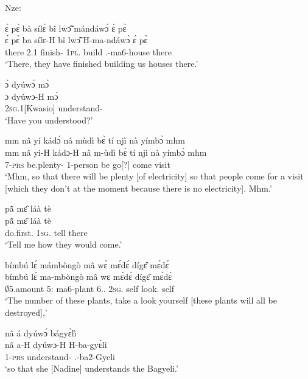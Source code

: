 \noindent Nze:

\begin{exe}[(C234)] 
\exC\label{205} 
  \glll ɛ́ pɛ̀ bà sílɛ́ bî lwɔ̃̂ mándáwɔ̀ ɛ́ pɛ̀ \\
        ɛ́ pɛ̀ ba sílɛ-H bî lwɔ̃̂ H-ma-ndáwɔ̀ ɛ́ pɛ̀  \\
        {\LOC} there 2.{\PST}1 finish-{\R} 1\textsc{pl}.{\OBJ} build {\OBJ}.{\LINK}-ma6-house {\LOC} there  \\
    \trans `There, they have finished building us houses there.'
 
\exC\label{206}
  \glll ɔ̀ dyúwɔ́ mɔ̀ \\
        ɔ dyúwɔ-H mɔ̀ \\
        2\textsc{sg}.{\PST}1[Kwasio] understand-{\R} {\COMPL}  \\
    \trans `Have you understood?'
 
\exC\label{207}
  \glll mm nâ yí kádɔ́ nâ mùdì bɛ̀ tí njì nà yímbɔ̀ mhm \\
        mm nâ yi-H kádɔ-H nâ m-ùdì bɛ̀ tí njì nà yímbɔ̀ mhm \\
        {\EXCL} {\COMP} 7-\textsc{prs} be.plenty-{\R} {\COMP} {\N}1-person be go[?] come {\CONJ} visit {\EXCL} \\
    \trans `Mhm, so that there will be plenty [of electricity] so that people come for a visit [which they don't at the moment because there is no electricity]. Mhm.'
 
\exC\label{208}
  \glll pã̂ mɛ̂ láà tè  \\
      pã̂ mɛ̂ láà tè \\
        do.first.{\IMP}  1\textsc{sg}.{\OBJ} tell there  \\
    \trans `Tell me how they would come.'
 
\exC\label{209}
  \glll bímbú lɛ́ mámbòngò mâ wɛ̀ mɛ́dɛ́ dígɛ̂ mɛ́dɛ́ \\
         bímbú lɛ́ ma-mbòngò mâ wɛ mɛ́dɛ́ dígɛ̂ mɛ́dɛ́ \\
       $\emptyset$5.amount 5:{\ATT}  ma6-plant 6.{\DEM}.{\PROX} 2\textsc{sg}.{\SBJ}  self look.{\IMP}  self   \\
    \trans `The number of these plants, take a look yourself [these plants will all be destroyed],'
 
\exC\label{210} 
  \glll nâ á dyúwɔ́ bágyɛ̀lì \\
         nâ a-H dyúwɔ-H H-ba-gyɛ̀lì \\
         {\COMP} 1-\textsc{prs} understand-{\R} {\OBJ}.{\LINK}-ba2-Gyeli \\
    \trans `so that she [Nadine] understands the Bagyeli.'
\end{exe}


